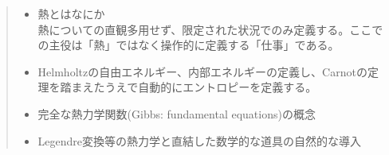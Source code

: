 \begin{quote}
  \begin{itemize}
    \item 熱とはなにか\\熱についての直観多用せず、限定された状況でのみ定義する。ここでの主役は「熱」ではなく操作的に定義する「仕事」である。
    \item Helmholtzの自由エネルギー、内部エネルギーの定義し、Carnotの定理を踏まえたうえで自動的にエントロピーを定義する。
    \item 完全な熱力学関数(Gibbs: fundamental equations)の概念
    \item Legendre変換等の熱力学と直結した数学的な道具の自然的な導入
  \end{itemize}
\end{quote}